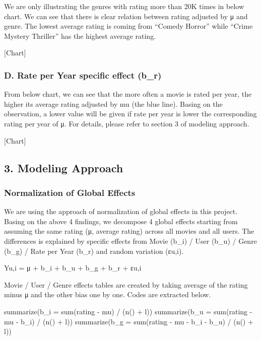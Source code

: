 \documentclass[
]{article}
\begin{document}
We are only illustrating the genres with rating more than 20K times in
below chart. We can see that there is clear relation between rating
adjusted by μ and genre. The lowest average rating is coming from
``Comedy \textbar{} Horror'' while ``Crime \textbar{} Mystery \textbar{}
Thriller'' has the highest average rating.

{[}Chart{]}

\hypertarget{d.-rate-per-year-specific-effect-b_r}{%
\subsubsection{D. Rate per Year specific effect
(b\_r)}\label{d.-rate-per-year-specific-effect-b_r}}

From below chart, we can see that the more often a movie is rated per
year, the higher its average rating adjusted by mu (the blue line).
Basing on the observation, a lower value will be given if rate per year
is lower the corresponding rating per year of μ. For details, please
refer to section 3 of modeling approach.

{[}Chart{]}

\hypertarget{modeling-approach}{%
\subsection{3. Modeling Approach}\label{modeling-approach}}

\hypertarget{normalization-of-global-effects}{%
\subsubsection{Normalization of Global
Effects}\label{normalization-of-global-effects}}

We are using the approach of normalization of global effects in this
project. Basing on the above 4 findings, we decompose 4 global effects
starting from assuming the same rating (μ, average rating) across all
movies and all users. The differences is explained by specific effects
from Movie (b\_i) / User (b\_u) / Genre (b\_g) / Rate per Year (b\_r)
and random variation (εu,i).

Yu,i = μ + b\_i + b\_u + b\_g + b\_r + εu,i

Movie / User / Genre effects tables are created by taking average of the
rating minus μ and the other bias one by one. Codes are extracted below.

summarize(b\_i = sum(rating - mu) / (n() + l)) summarize(b\_u =
sum(rating - mu - b\_i) / (n() + l)) summarize(b\_g = sum(rating - mu -
b\_i - b\_u) / (n() + l))
\end{document}
